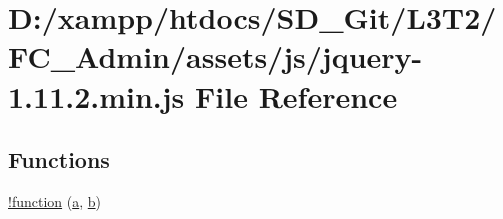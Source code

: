 \hypertarget{_admin_2assets_2js_2jquery-1_811_82_8min_8js}{}\section{D\+:/xampp/htdocs/\+S\+D\+\_\+\+Git/\+L3\+T2/\+F\+C\+\_\+\+Admin/assets/js/jquery-\/1.11.2.min.\+js File Reference}
\label{_admin_2assets_2js_2jquery-1_811_82_8min_8js}
\subsection*{Functions}
\begin{DoxyCompactItemize}
\item 
\hyperlink{_admin_2assets_2js_2jquery-1_811_82_8min_8js_a43f0b96ea8ec44ca20ba86809a785614}{!function} (\hyperlink{_admin_2assets_2js_2bootstrap_8min_8js_a1f5870dcf487187f13d5fd328ed9e6e7}{a}, \hyperlink{_admin_2assets_2js_2bootstrap_8min_8js_a398bb8542498d1b14178b02b99df309b}{b})
\item 

\end{DoxyCompactItemize}
